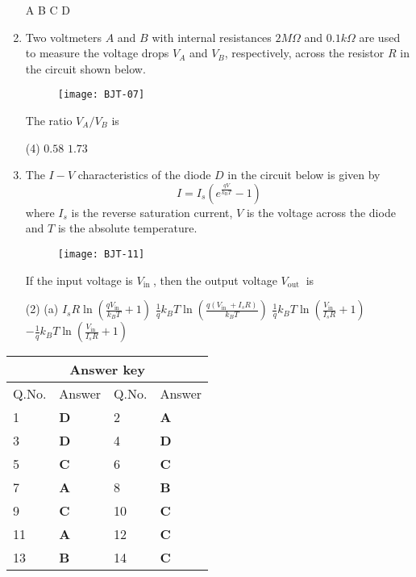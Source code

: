 \begin{enumerate}
\begin{tasks}
		\task[\textbf{A.}] A
		\task[\textbf{B.}] B
		\task[\textbf{C.}] C
		\task[\textbf{D.}] D
	\end{tasks}
	\item Two voltmeters $A$ and $B$ with internal resistances $2 M \Omega$ and $0.1 k \Omega$ are used to measure the voltage drops $V_{A}$ and $V_{B}$, respectively, across the resistor $R$ in the circuit shown below.\\
	\begin{figure}[H]
		\centering
		\texttt{[image: BJT-07]}
	\end{figure}
	The ratio $V_{A} / V_{B}$ is
	{}
	\begin{tasks}(4)
		\task[\textbf{A.}] $0.58$
		\task[\textbf{B.}] $1.73$
	\end{tasks}
	\item The $I-V$ characteristics of the diode $D$ in the circuit below is given by
	$$
	I=I_{s}\left(e^{\frac{q V}{k_{\mathrm{B}} T}}-1\right)
	$$
	where $I_{s}$ is the reverse saturation current, $V$ is the voltage across the diode and $T$ is the absolute temperature.\\
	\begin{figure}[H]
		\centering
		\texttt{[image: BJT-11]}
	\end{figure}
	If the input voltage is $V_{\text {in }}$, then the output voltage $V_{\text {out }}$ is
	{}
	\begin{tasks}(2)
		\task[\textbf{A.}] (a) $I_{s} R \ln \left(\frac{q V_{\text {in }}}{k_{B} T}+1\right)$
		\task[\textbf{B.}] $\frac{1}{q} k_{B} T \ln \left(\frac{q\left(V_{\text {in }}+I_{s} R\right)}{k_{B} T}\right)$
		\task[\textbf{C.}]  $\frac{1}{q} k_{B} T \ln \left(\frac{V_{\text {in }}}{I_{s} R}+1\right)$
		\task[\textbf{D.}]  $-\frac{1}{q} k_{B} T \ln \left(\frac{V_{\text {in }}}{I_{s} R}+1\right)$
	\end{tasks}
\end{enumerate}
\setlength\arrayrulewidth{1pt}
\begin{table}[H]
	\centering
	\begin{tabular}{|p{1.5cm}|p{1.5cm}||p{1.5cm}|p{1.5cm}|}
		\hline
		\multicolumn{4}{|c|}{\textbf{Answer key}}\\\hline\hline
		\rowcolor{ocrel}Q.No.&Answer&Q.No.&Answer\\\hline
		1&\textbf{D} &2&\textbf{A}\\\hline 
		3&\textbf{D} &4&\textbf{D} \\\hline
		5&\textbf{C} &6&\textbf{C} \\\hline
		7&\textbf{A}&8&\textbf{B}\\\hline
		9&\textbf{C}&10&\textbf{C}\\\hline
		11&\textbf{A} &12&\textbf{C}\\\hline
		13&\textbf{B}&14&\textbf{C}\\\hline
	\end{tabular}
\end{table}

